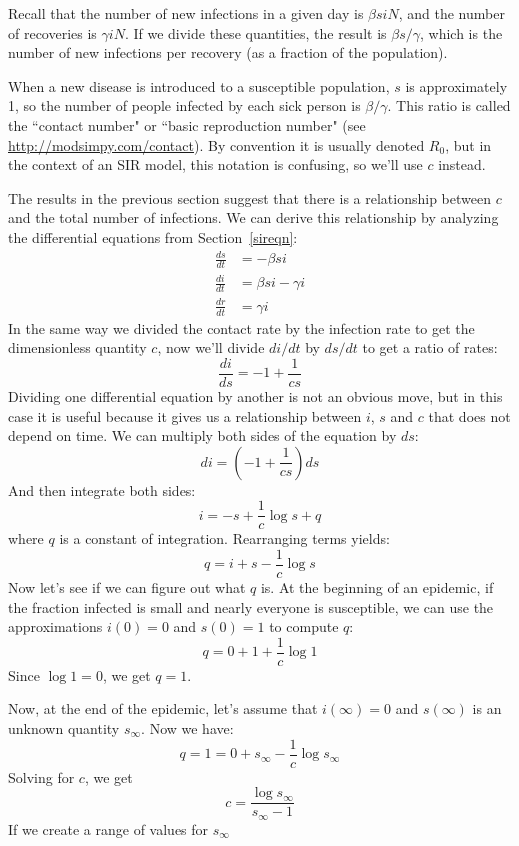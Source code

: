 \documentclass[12pt]{book}
\theoremstyle{exercise}
\begin{document}
Recall that the number of new infections in a given day is $\beta s i N$, and the number of recoveries is $\gamma i N$.  If we divide these quantities, the result is $\beta s / \gamma$, which is the number of new infections per recovery (as a fraction of the population).


When a new disease is introduced to a susceptible population, $s$ is approximately 1, so the number of people infected by each sick person is $\beta / \gamma$.  This ratio is called the ``contact number" or ``basic reproduction number" (see \url{http://modsimpy.com/contact}).  By convention it is usually denoted $R_0$, but in the context of an SIR model, this notation is confusing, so we'll use $c$ instead.

The results in the previous section suggest that there is a relationship between $c$ and the total number of infections.  We can derive this relationship by analyzing the differential equations from Section~\ref{sireqn}:
%
\begin{align*}
\frac{ds}{dt} &= -\beta s i \\
\frac{di}{dt} &= \beta s i - \gamma i\\
\frac{dr}{dt} &= \gamma i
\end{align*}
%
In the same way we divided the contact rate by the infection rate to get the dimensionless quantity $c$, now we'll divide $di/dt$ by $ds/dt$ to get a ratio of rates:
%
\[ \frac{di}{ds} = -1 + \frac{1}{cs} \]
%
Dividing one differential equation by another is not an obvious move, but in this case it is useful because it gives us a relationship between $i$, $s$ and $c$ that does not depend on time.  We can multiply both sides of the equation by $ds$:
%
\[ di = \left( -1 + \frac{1}{cs} \right) ds \]
%
And then integrate both sides:
%
\[ i = -s + \frac{1}{c} \log s + q \]
%
where $q$ is a constant of integration.  Rearranging terms yields:
%
\[ q = i + s - \frac{1}{c} \log s \]
%
Now let's see if we can figure out what $q$ is.  At the beginning of an epidemic, if the fraction infected is small and nearly everyone is susceptible, we can use the approximations $i(0) = 0$ and $s(0) = 1$ to compute $q$:
%
\[ q = 0 + 1 + \frac{1}{c} \log 1 \]
%
Since $\log 1 = 0$, we get $q = 1$.

\newcommand{\sinf}{s_{\infty}}

Now, at the end of the epidemic, let's assume that $i(\infty) = 0$ and $s(\infty)$ is an unknown quantity $\sinf$.  Now we have:
%
\[ q = 1 = 0 + \sinf - \frac{1}{c} \log \sinf \]
%
Solving for $c$, we get
%
\[ c = \frac{\log \sinf}{\sinf - 1} \]
%
If we create a range of values for $\sinf$
\end{document}
